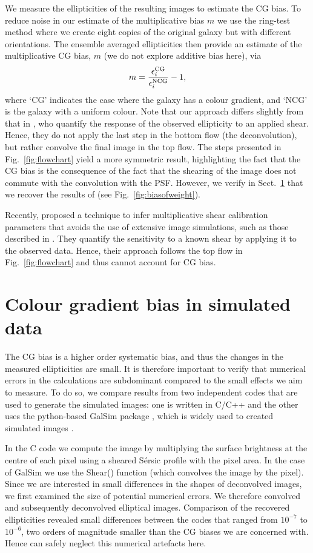 \documentclass[useAMS,usenatbib]{mnras}
\newcommand{\be}{\begin{equation}}
\newcommand{\ee}{\end{equation}}
\begin{document}
We measure the ellipticities of the resulting images to estimate the CG bias. To reduce noise in our estimate of the multiplicative bias $m$ we use the ring-test method \citep{Nakajima07} where we create eight copies of the original galaxy but with different orientations. The ensemble averaged ellipticities then  provide an estimate of the multiplicative CG bias, $m$ (we do not explore additive bias here), via
%
\be
m= {\epsilon_i^{\rm CG} \over \epsilon_i^{\rm NCG} }-1,
\ee
%
where `CG' indicates the case where the galaxy has a colour gradient, and `NCG' is the galaxy
with a uniform colour. Note that our approach differs slightly from that in , who quantify the response of the observed ellipticity to an applied shear. Hence, they do not apply the last step
in the bottom flow (the deconvolution), but rather convolve the final image in the top flow. 
The steps presented in Fig.~\ref{fig:flowchart} yield a more symmetric result, highlighting the fact
that the CG bias is the consequence of the fact that the shearing of the image does not commute 
with the convolution with the PSF. However, we verify in Sect.~\ref{sec:simulations} that we recover
the results of  (see Fig.~\ref{fig:biasofweight}). 

Recently, \cite{Huff17} proposed a technique to infer multiplicative shear calibration parameters that avoids the use of extensive image simulations, such as those described in \citep{Hoekstra17}. They quantify the 
sensitivity to a known shear by applying it to the observed data. Hence, their approach follows the top flow in Fig.~\ref{fig:flowchart} and thus cannot account for CG bias. 

\section{Colour gradient bias in simulated data}
\label{sec:simulations}

The CG bias is a higher order systematic bias, and thus the changes in the measured ellipticities are small. It is therefore important to verify that numerical errors in the calculations are subdominant compared to the small effects we aim to measure. To do so, we compare results from two independent codes that are used to generate the simulated images: one is written in C/C++ and the other uses the
python-based {\sc GalSim} package \citep{Rowe15}, which is widely used to created simulated images \citep[e.g.][]{FenechConti17, Hoekstra17}. 
  
In the C code we compute the image by multiplying the surface brightness at the centre of each pixel using a sheared S{\'e}rsic profile with the pixel area. In the case of {\sc GalSim} we use the {\sc Shear()} function (which convolves the image by the pixel). Since we are interested in small differences in the shapes of
deconvolved images, we first examined the size of potential numerical errors. We therefore convolved and
subsequently deconvolved elliptical images. Comparison of the recovered ellipticities revealed small differences between the codes that ranged from $10^{-7}$ to $10^{-6}$, two orders of magnitude
smaller than the CG biases we are concerned with. Hence can safely neglect this numerical artefacts here.
\end{document}
